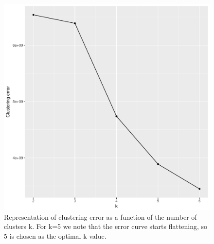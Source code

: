 \documentclass{acm_proc_article-sp-sigmod09}
\begin{document}
\begin{figure}
	\centering
	\includegraphics[width=1\columnwidth]{resources/clustered_plots/elbow.pdf}
	\caption{Representation of clustering error as a function of the number of clusters k. For k=5 we note that the error curve starts flattening, so 5 is chosen as the optimal k value.}
	\label{fig:elbow}
\end{figure}


\end{document}
